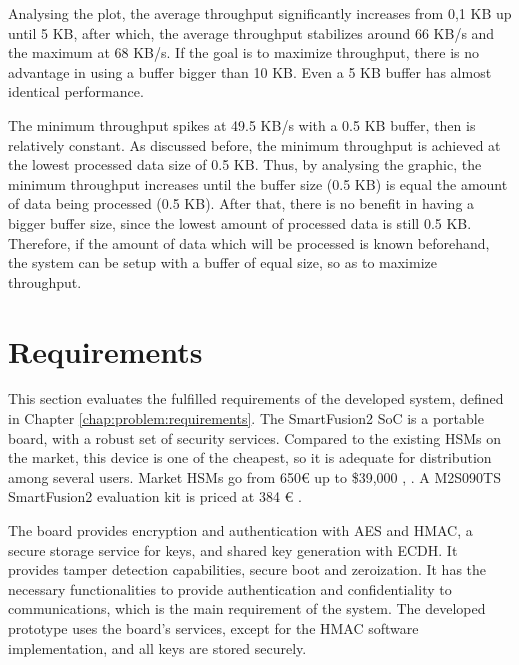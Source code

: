 Analysing the plot, the average throughput significantly increases from 0,1 KB up until 5 KB, after which, the average throughput stabilizes around 66 KB/s and the maximum at 68 KB/s. 
If the goal is to maximize throughput, there is no advantage in using a buffer bigger than 10 KB. Even a 5 KB buffer has almost identical performance. 

The minimum throughput spikes at 49.5 KB/s with a 0.5 KB buffer, then is relatively constant. As discussed before, the minimum throughput is achieved at the lowest processed data size of 0.5 KB. Thus, by analysing the graphic, the minimum throughput increases until the buffer size (0.5 KB) is equal the amount of data being processed (0.5 KB). After that, there is no benefit in having a bigger buffer size, since the lowest amount of processed data is still 0.5 KB.
Therefore, if the amount of data which will be processed is known beforehand, the system can be setup with a buffer of equal size, so as to maximize throughput.

\section{Requirements}\label{chap:evaluation:requirements}

This section evaluates the fulfilled requirements of the developed system, defined in Chapter \ref{chap:problem:requirements}.
The SmartFusion2 SoC is a portable board, with a robust set of security services.
Compared to the existing HSMs on the market, this device is one of the cheapest, so it is adequate for distribution among several users. Market HSMs go from 650€ up to \$39,000 \cite{HSMpriceArticles}, \cite{HSMPresentationPrices}. A M2S090TS SmartFusion2 evaluation kit is priced at 384 € \cite{smartfusionPrice}.

The board provides encryption and authentication with AES and HMAC, a secure storage service for keys, and shared key generation with ECDH. It provides tamper detection capabilities, secure boot and zeroization.
It has the necessary functionalities to provide authentication and confidentiality to communications, which is the main requirement of the system.
The developed prototype uses the board's services, except for the HMAC software implementation, and all keys are stored securely.


